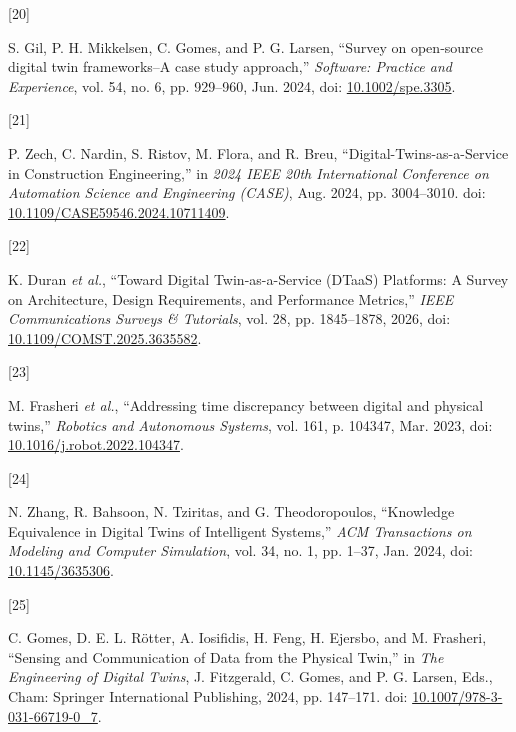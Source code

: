 \documentclass[
  12pt,
  a4paper,
]{article}
\newlength{\cslhangindent}
\newlength{\csllabelwidth}
\newenvironment{CSLReferences}[2] %
 {\begin{list}{}{%
  \setlength{\itemindent}{0pt}
  \setlength{\leftmargin}{0pt}
  \setlength{\parsep}{0pt}
  \ifodd #1
   \setlength{\leftmargin}{\cslhangindent}
   \setlength{\itemindent}{-1\cslhangindent}
  \fi
  \setlength{\itemsep}{#2\baselineskip}}}
 {\end{list}}
\newcommand{\CSLLeftMargin}[1]{\parbox[t]{\csllabelwidth}{\strut#1\strut}}
\newcommand{\CSLRightInline}[1]{\parbox[t]{\linewidth - \csllabelwidth}{\strut#1\strut}}
\begin{document}
\begin{CSLReferences}{0}{0}
\CSLLeftMargin{{[}20{]} }%
\CSLRightInline{S. Gil, P. H. Mikkelsen, C. Gomes, and P. G. Larsen,
{``Survey on open‐source digital twin frameworks--{A} case study
approach,''} \emph{Software: Practice and Experience}, vol. 54, no. 6,
pp. 929--960, Jun. 2024, doi:
\href{https://doi.org/10.1002/spe.3305}{10.1002/spe.3305}.}

\CSLLeftMargin{{[}21{]} }%
\CSLRightInline{P. Zech, C. Nardin, S. Ristov, M. Flora, and R. Breu,
{``Digital-{Twins}-as-a-{Service} in {Construction} {Engineering},''} in
\emph{2024 {IEEE} 20th {International} {Conference} on {Automation}
{Science} and {Engineering} ({CASE})}, Aug. 2024, pp. 3004--3010. doi:
\href{https://doi.org/10.1109/CASE59546.2024.10711409}{10.1109/CASE59546.2024.10711409}.}

\CSLLeftMargin{{[}22{]} }%
\CSLRightInline{K. Duran \emph{et al.}, {``Toward {Digital}
{Twin}-as-a-{Service} ({DTaaS}) {Platforms}: {A} {Survey} on
{Architecture}, {Design} {Requirements}, and {Performance} {Metrics},''}
\emph{IEEE Communications Surveys \& Tutorials}, vol. 28, pp.
1845--1878, 2026, doi:
\href{https://doi.org/10.1109/COMST.2025.3635582}{10.1109/COMST.2025.3635582}.}

\CSLLeftMargin{{[}23{]} }%
\CSLRightInline{M. Frasheri \emph{et al.}, {``Addressing time
discrepancy between digital and physical twins,''} \emph{Robotics and
Autonomous Systems}, vol. 161, p. 104347, Mar. 2023, doi:
\href{https://doi.org/10.1016/j.robot.2022.104347}{10.1016/j.robot.2022.104347}.}

\CSLLeftMargin{{[}24{]} }%
\CSLRightInline{N. Zhang, R. Bahsoon, N. Tziritas, and G.
Theodoropoulos, {``Knowledge {Equivalence} in {Digital} {Twins} of
{Intelligent} {Systems},''} \emph{ACM Transactions on Modeling and
Computer Simulation}, vol. 34, no. 1, pp. 1--37, Jan. 2024, doi:
\href{https://doi.org/10.1145/3635306}{10.1145/3635306}.}

\CSLLeftMargin{{[}25{]} }%
\CSLRightInline{C. Gomes, D. E. L. Rötter, A. Iosifidis, H. Feng, H.
Ejersbo, and M. Frasheri, {``Sensing and {Communication} of {Data} from
the {Physical} {Twin},''} in \emph{The {Engineering} of {Digital}
{Twins}}, J. Fitzgerald, C. Gomes, and P. G. Larsen, Eds., Cham:
Springer International Publishing, 2024, pp. 147--171. doi:
\href{https://doi.org/10.1007/978-3-031-66719-0_7}{10.1007/978-3-031-66719-0\_7}.}


\end{CSLReferences}
\end{document}
